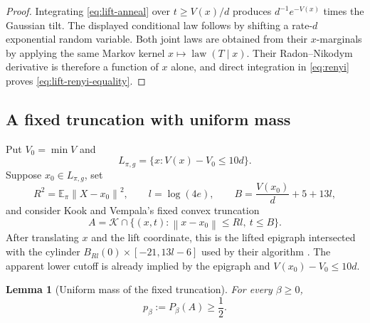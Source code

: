 \documentclass[11pt]{article}
\newtheorem{lemma}[theorem]{Lemma}
\theoremstyle{remark}
\newcommand{\E}{\mathbb E}
\newcommand{\1}{\bm 1}
\newcommand{\law}{\operatorname{law}}
\newcommand{\norm}[1]{\left\lVert #1\right\rVert}
\begin{document}
\begin{proof}
Integrating \eqref{eq:lift-anneal} over
$t\geq V(x)/d$ produces $d^{-1}e^{-V(x)}$ times the Gaussian tilt.
The displayed conditional law follows by shifting a rate-$d$
exponential random variable.  Both joint laws are obtained from their
$x$-marginals by applying the same Markov kernel $x\mapsto\law(T\mid x)$.
Their Radon--Nikodym derivative is therefore a function of $x$ alone,
and direct integration in \eqref{eq:renyi} proves
\eqref{eq:lift-renyi-equality}.
\end{proof}

\subsection{A fixed truncation with uniform mass}

Put $V_0=\min V$ and
\[
  L_{\pi,g}=\{x:V(x)-V_0\leq10d\}.
\]
Suppose $x_0\in L_{\pi,g}$, set
\[
  R^2=\E_\pi\norm{X-x_0}^2,
  \qquad l=\log(4e),
  \qquad B=\frac{V(x_0)}d+5+13l,
\]
and consider Kook and Vempala's fixed convex truncation
\begin{equation}\label{eq:fixed-lift-truncation}
  A=\mathcal K\cap
  \bigl\{(x,t):\norm{x-x_0}\leq Rl,\ t\leq B\bigr\}.
\end{equation}
After translating $x$ and the lift coordinate, this is the lifted
epigraph intersected with the cylinder
$B_{Rl}(0)\times[-21,13l-6]$ used by their algorithm
\citep[Equation~(5.1)]{KV26zeroth}.  The apparent lower cutoff is already
implied by the epigraph and $V(x_0)-V_0\leq10d$.

\begin{lemma}[Uniform mass of the fixed truncation]
\label{lem:uniform-truncation-mass}
For every $\beta\geq0$,
\begin{equation}\label{eq:uniform-truncation-mass}
  p_\beta:=P_\beta(A)\geq\frac12.
\end{equation}
\end{lemma}
\end{document}
